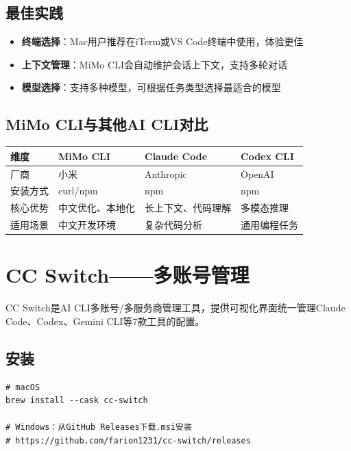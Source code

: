 \subsection{最佳实践}

\begin{itemize}
  \item \textbf{终端选择}：Mac用户推荐在iTerm或VS Code终端中使用，体验更佳
  \item \textbf{上下文管理}：MiMo CLI会自动维护会话上下文，支持多轮对话
  \item \textbf{模型选择}：支持多种模型，可根据任务类型选择最适合的模型
\end{itemize}

\subsection{MiMo CLI与其他AI CLI对比}

\begin{table}[H]
\centering
\begin{tabular}{llll}
\toprule
\textbf{维度} & \textbf{MiMo CLI} & \textbf{Claude Code} & \textbf{Codex CLI} \\
\midrule
厂商 & 小米 & Anthropic & OpenAI \\
安装方式 & curl/npm & npm & npm \\
核心优势 & 中文优化、本地化 & 长上下文、代码理解 & 多模态推理 \\
适用场景 & 中文开发环境 & 复杂代码分析 & 通用编程任务 \\
\bottomrule
\end{tabular}
\end{table}

\section{CC Switch——多账号管理}

CC Switch是AI CLI多账号/多服务商管理工具，提供可视化界面统一管理Claude Code、Codex、Gemini CLI等7款工具的配置。

\subsection{安装}

\begin{lstlisting}[style=shell]
# macOS
brew install --cask cc-switch

# Windows：从GitHub Releases下载.msi安装
# https://github.com/farion1231/cc-switch/releases
\end{lstlisting}

